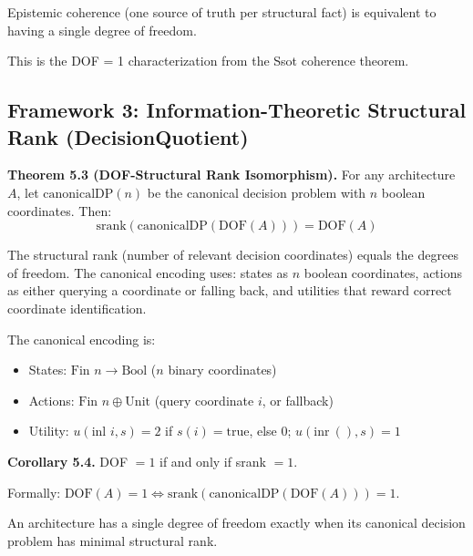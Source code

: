 \begin{informal}
Epistemic coherence (one source of truth per structural fact) is equivalent to having a single degree of freedom.
\end{informal}


This is the DOF = 1 characterization from the Ssot coherence theorem.

\subsection{Framework 3: Information-Theoretic Structural Rank (DecisionQuotient)}

\begin{formal}
\textbf{Theorem 5.3 (DOF-Structural Rank Isomorphism).} For any architecture $A$, let $\text{canonicalDP}(n)$ be the canonical decision problem with $n$ boolean coordinates. Then:
\[
\text{srank}(\text{canonicalDP}(\text{DOF}(A))) = \text{DOF}(A)
\]
\end{formal}

\begin{informal}
The structural rank (number of relevant decision coordinates) equals the degrees of freedom. The canonical encoding uses: states as $n$ boolean coordinates, actions as either querying a coordinate or falling back, and utilities that reward correct coordinate identification.
\end{informal}

The canonical encoding is:
\begin{itemize}
\item States: $\text{Fin } n \to \text{Bool}$ ($n$ binary coordinates)
\item Actions: $\text{Fin } n \oplus \text{Unit}$ (query coordinate $i$, or fallback)
\item Utility: $u(\text{inl } i, s) = 2$ if $s(i) = \text{true}$, else $0$; $u(\text{inr}\ (), s) = 1$
\end{itemize}


\begin{formal}
\textbf{Corollary 5.4.} DOF $= 1$ if and only if srank $= 1$.

Formally: $\text{DOF}(A) = 1 \iff \text{srank}(\text{canonicalDP}(\text{DOF}(A))) = 1$.
\end{formal}

\begin{informal}
An architecture has a single degree of freedom exactly when its canonical decision problem has minimal structural rank.
\end{informal}

